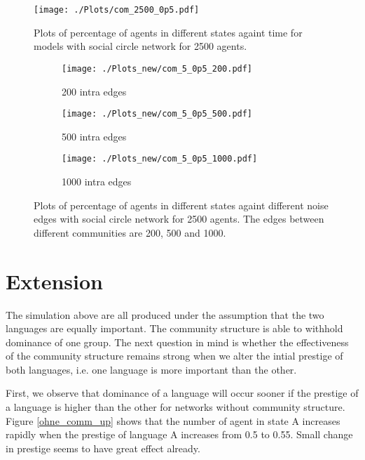 \documentclass[a4paper, 11pt]{article}
\begin{document}
\begin{figure}[!tbp] 
  \centering
  \texttt{[image: ./Plots/com\_2500\_0p5.pdf]}
\caption{Plots of percentage of agents in different states againt time for models with social circle network for 2500 agents.}
\label{social_circle}
\end{figure}



\begin{figure}
  \begin{subfigure}[b]{0.32\textwidth}
    \texttt{[image: ./Plots\_new/com\_5\_0p5\_200.pdf]}
    \caption{200 intra edges}
  \end{subfigure}
  \begin{subfigure}[b]{0.32\textwidth}
    \texttt{[image: ./Plots\_new/com\_5\_0p5\_500.pdf]}
    \caption{500 intra edges}
  \end{subfigure}
  \begin{subfigure}[b]{0.32\textwidth}
    \texttt{[image: ./Plots\_new/com\_5\_0p5\_1000.pdf]}
    \caption{1000 intra edges}
  \end{subfigure}
\caption{Plots of percentage of agents in different states againt different noise edges with social circle network for 2500 agents. The edges between different communities are 200, 500 and 1000.}
\label{comm_noiseEdge}
\end{figure}

\section{Extension}
The simulation above are all produced under the assumption that the two languages are equally important. The community structure is able to withhold dominance of one group. The next question in mind is whether the effectiveness of the community structure remains strong when we alter the intial prestige of both languages, i.e. one language is more important than the other. 

First, we observe that dominance of a language will occur sooner if the prestige of a language is higher than the other for networks without community structure. Figure \ref{ohne_comm_up} shows that the number of agent in state A increases rapidly when the prestige of language A increases from 0.5 to 0.55. Small change in prestige seems to have great effect already. 
\end{document}
